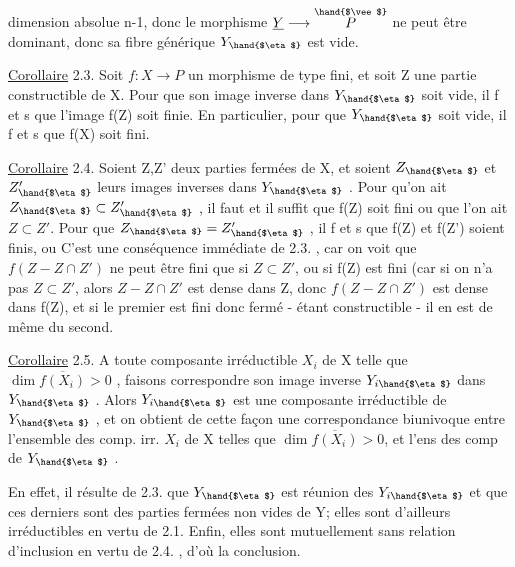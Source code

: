 
dimension absolue n-1, donc le morphisme $\underline{Y}\longrightarrow \overset{\hand{$\vee$}}{P}$ ne peut être dominant,
donc sa fibre générique $Y_{\hand{$\eta$}}$ est vide.

\uline{Corollaire} 2.3. Soit $f:X\longrightarrow P$ un morphisme de type fini, et soit Z une
partie constructible de X. Pour que son image inverse dans $Y_{\hand{$\eta$}}$ soit vide,
il f et s que l'image f(Z) soit finie. En particulier, pour que  $Y_{\hand{$\eta$}}$ soit
vide, il f et s que f(X) soit fini.

\uline{Corollaire} 2.4. Soient Z,Z' deux parties fermées  de X,
et soient $Z_{\hand{$\eta$}}$ et $Z'_{\hand{$\eta$}}$ leurs images inverses dans $Y_{\hand{$\eta$}}$ . Pour qu'on ait
$Z_{\hand{$\eta$}}\subset Z'_{\hand{$\eta$}}$ , il faut et il suffit que f(Z) soit fini ou que l'on ait $Z\subset Z'$.
Pour que $Z_{\hand{$\eta$}} = Z'_{\hand{$\eta$}}$ , il f et s que  f(Z) et f(Z') soient finis, ou 
 C'est une conséquence 
 immédiate de 2.3. , car on voit que $f(Z - Z\cap Z')$ ne peut être fini
que si $Z\subset Z'$, ou si f(Z) est fini (car si on n'a pas $Z\subset Z'$, alors $Z-Z\cap Z'$
est dense dans Z, donc $f(Z-Z\cap Z')$ est dense dans f(Z), et si le premier
est fini donc fermé - étant constructible - il en est de même du second.

\uline{Corollaire} 2.5. A toute composante irréductible $X_i$ de X telle que
$\dim \overline{f(X_i)} > 0$ , faisons correspondre  son image inverse $Y_{i\hand{$\eta$}}$ dans
$Y_{\hand{$\eta$}}$ . Alors $Y_{i\hand{$\eta$}}$ est une composante irréductible de $Y_{\hand{$\eta$}}$ , et on obtient de
cette façon une correspondance biunivoque entre l'ensemble des comp. irr.
$X_i$ de X telles que $\dim \overline{f(X_i)}> 0$, et l'ens des comp  de $Y_{\hand{$\eta$}}$ .

En effet, il résulte de 2.3. que  $Y_{\hand{$\eta$}}$ est réunion des $Y_{i\hand{$\eta$}}$ 
et que ces derniers sont des parties fermées non vides de Y; elles sont
d'ailleurs irréductibles en vertu de 2.1. Enfin, elles sont mutuellement
sans relation d'inclusion en vertu de 2.4. , d'où la conclusion.

